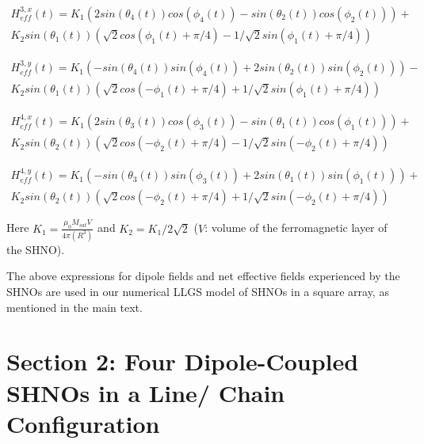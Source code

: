 \documentclass[10pt]{article}
\begin{document}
\begin{multline}
H_{eff}^{3,x}(t) =  K_1 (2 sin(\theta_4(t)) cos(\phi_4(t)) -  sin(\theta_2(t)) cos(\phi_2(t))) + \\
              K_2 sin(\theta_1(t)) (\sqrt{2} cos(\phi_1(t) +  \pi/4) 
              - 1/\sqrt{2} sin(\phi_1(t) + \pi/4))
\label{RFfield_3x}    
\end{multline}


\begin{multline}
H_{eff}^{3,y}(t) = 
K_1 (- sin(\theta_4(t)) sin(\phi_4(t)) + 2 sin(\theta_2(t)) sin(\phi_2(t))) - \\
              K_2 sin(\theta_1(t)) (\sqrt{2} cos(-\phi_1(t) + \pi/4) + 1/\sqrt{2} sin(\phi_1(t) + \pi/4))
\label{RFfield_3y}    
\end{multline}



\begin{multline}
H_{eff}^{4,x}(t) =  K_1 (2 sin(\theta_3(t)) cos(\phi_3(t)) -  sin(\theta_1(t)) cos(\phi_1(t))) + \\
              K_2 sin(\theta_2(t)) (\sqrt{2} cos(-\phi_2(t) +  \pi/4) 
              - 1/\sqrt{2} sin(-\phi_2(t) + \pi/4))
\label{RFfield_4x}    
\end{multline}



\begin{multline}
H_{eff}^{4,y}(t) = 
K_1 (- sin(\theta_3(t)) sin(\phi_3(t)) + 2 sin(\theta_1(t)) sin(\phi_1(t))) + \\
              K_2 sin(\theta_2(t)) (\sqrt{2} cos(-\phi_2(t) + \pi/4) + 1/\sqrt{2} sin(-\phi_2(t) + \pi/4))
\label{RFfield_4y}    
\end{multline}

Here $K_1 = \frac{\mu_{0}M_{sat}V} {4\pi(R^3)}$ and $K_2 = K_1/ 2 \sqrt{2}$ ($V$: volume of the ferromagnetic layer of the SHNO).

The above expressions for dipole fields and net effective fields experienced by the SHNOs are used in our numerical LLGS model of SHNOs in a square array, as mentioned in the main text.  


\section*{Section 2: Four Dipole-Coupled SHNOs in a Line/ Chain Configuration}
\end{document}
